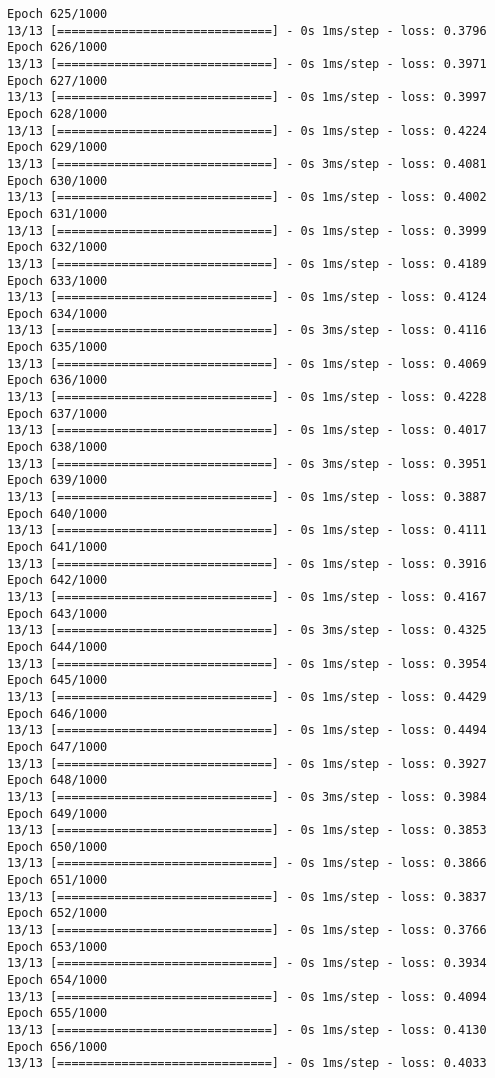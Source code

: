 \documentclass[11pt]{article}
\begin{document}
\begin{Verbatim}[commandchars=\\\{\}]
Epoch 625/1000
13/13 [==============================] - 0s 1ms/step - loss: 0.3796
Epoch 626/1000
13/13 [==============================] - 0s 1ms/step - loss: 0.3971
Epoch 627/1000
13/13 [==============================] - 0s 1ms/step - loss: 0.3997
Epoch 628/1000
13/13 [==============================] - 0s 1ms/step - loss: 0.4224
Epoch 629/1000
13/13 [==============================] - 0s 3ms/step - loss: 0.4081
Epoch 630/1000
13/13 [==============================] - 0s 1ms/step - loss: 0.4002
Epoch 631/1000
13/13 [==============================] - 0s 1ms/step - loss: 0.3999
Epoch 632/1000
13/13 [==============================] - 0s 1ms/step - loss: 0.4189
Epoch 633/1000
13/13 [==============================] - 0s 1ms/step - loss: 0.4124
Epoch 634/1000
13/13 [==============================] - 0s 3ms/step - loss: 0.4116
Epoch 635/1000
13/13 [==============================] - 0s 1ms/step - loss: 0.4069
Epoch 636/1000
13/13 [==============================] - 0s 1ms/step - loss: 0.4228
Epoch 637/1000
13/13 [==============================] - 0s 1ms/step - loss: 0.4017
Epoch 638/1000
13/13 [==============================] - 0s 3ms/step - loss: 0.3951
Epoch 639/1000
13/13 [==============================] - 0s 1ms/step - loss: 0.3887
Epoch 640/1000
13/13 [==============================] - 0s 1ms/step - loss: 0.4111
Epoch 641/1000
13/13 [==============================] - 0s 1ms/step - loss: 0.3916
Epoch 642/1000
13/13 [==============================] - 0s 1ms/step - loss: 0.4167
Epoch 643/1000
13/13 [==============================] - 0s 3ms/step - loss: 0.4325
Epoch 644/1000
13/13 [==============================] - 0s 1ms/step - loss: 0.3954
Epoch 645/1000
13/13 [==============================] - 0s 1ms/step - loss: 0.4429
Epoch 646/1000
13/13 [==============================] - 0s 1ms/step - loss: 0.4494
Epoch 647/1000
13/13 [==============================] - 0s 1ms/step - loss: 0.3927
Epoch 648/1000
13/13 [==============================] - 0s 3ms/step - loss: 0.3984
Epoch 649/1000
13/13 [==============================] - 0s 1ms/step - loss: 0.3853
Epoch 650/1000
13/13 [==============================] - 0s 1ms/step - loss: 0.3866
Epoch 651/1000
13/13 [==============================] - 0s 1ms/step - loss: 0.3837
Epoch 652/1000
13/13 [==============================] - 0s 1ms/step - loss: 0.3766
Epoch 653/1000
13/13 [==============================] - 0s 1ms/step - loss: 0.3934
Epoch 654/1000
13/13 [==============================] - 0s 1ms/step - loss: 0.4094
Epoch 655/1000
13/13 [==============================] - 0s 1ms/step - loss: 0.4130
Epoch 656/1000
13/13 [==============================] - 0s 1ms/step - loss: 0.4033

\end{Verbatim}
\end{document}
